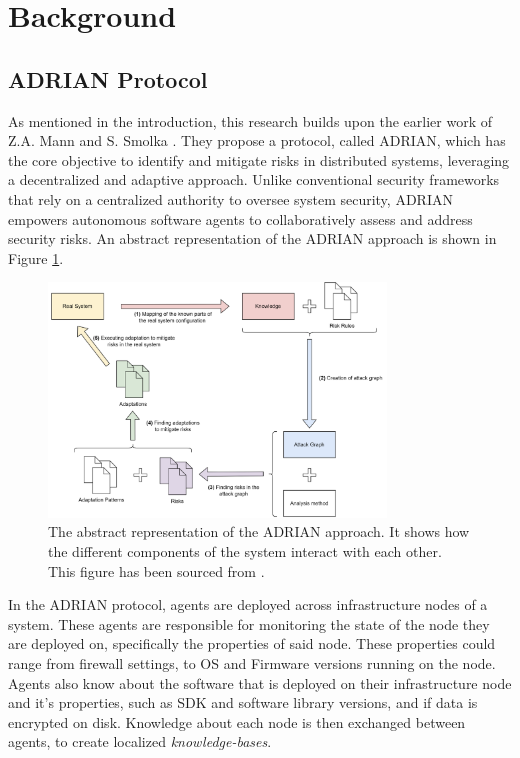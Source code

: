 \section{Background}
\label{sec:background}

\subsection{ADRIAN Protocol}
\label{ssec:adrian}

As mentioned in the introduction, this research builds upon the earlier work of Z.A. Mann and S. Smolka \cite{mann2023ADRIAN}. They propose a protocol, called ADRIAN, which has the core objective to identify and mitigate risks in distributed systems, leveraging a decentralized and adaptive approach. Unlike conventional security frameworks that rely on a centralized authority to oversee system security, ADRIAN empowers autonomous software agents to collaboratively assess and address security risks. An abstract representation of the ADRIAN approach is shown in Figure \ref{fig:adrian-architecture}.

\begin{figure}
    \centering
    \includegraphics[width=0.8\textwidth]{content/adrian-architecture.png}
    \caption{The abstract representation of the ADRIAN approach. It shows how the different components of the system interact with each other. This figure has been sourced from \cite{mann2023ADRIAN}.}
    \label{fig:adrian-architecture}
\end{figure}

In the ADRIAN protocol, agents are deployed across infrastructure nodes of a system. These agents are responsible for monitoring the state of the node they are deployed on, specifically the properties of said node. These properties could range from firewall settings, to OS and Firmware versions running on the node. Agents also know about the software that is deployed on their infrastructure node and it's properties, such as SDK and software library versions, and if data is encrypted on disk. Knowledge about each node is then exchanged between agents, to create localized \emph{knowledge-bases}.

